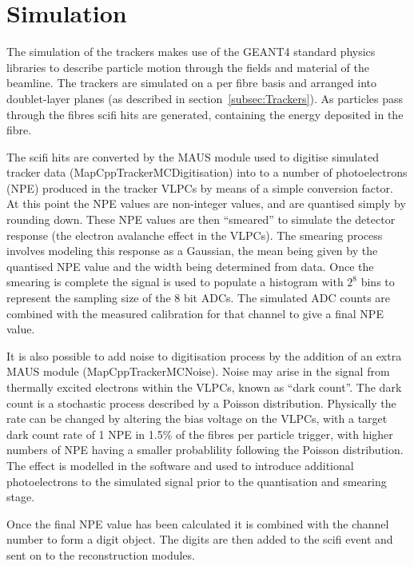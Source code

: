 \section{Simulation}
\label{sec:Simulation}

The simulation of the trackers makes use of the GEANT4 standard physics libraries to describe particle motion through the fields and material of the beamline. The trackers are simulated on a per fibre basis and arranged into doublet-layer planes (as described in section~\ref{subsec:Trackers}). As particles pass through the fibres scifi hits are generated, containing the energy deposited in the fibre. 

The scifi hits are converted by the MAUS module used to digitise simulated tracker data (MapCppTrackerMCDigitisation) into to a number of photoelectrons (NPE) produced in the tracker VLPCs by means of a simple conversion factor. At this point the NPE values are non-integer values, and are quantised simply by rounding down. These NPE values are then ``smeared'' to simulate the detector response (the electron avalanche effect in the VLPCs). The smearing process involves modeling this response as a Gaussian, the mean being given by the quantised NPE value and the width being determined from data. Once the smearing is complete the signal is used to populate a histogram with $2^8$ bins to represent the sampling size of the 8 bit ADCs. The simulated ADC counts are combined with the measured calibration for that channel to give a final NPE value.

It is also possible to add noise to digitisation process by the addition of an extra MAUS module (MapCppTrackerMCNoise). Noise may arise in the signal from thermally excited electrons within the VLPCs, known as ``dark count''. The dark count is a stochastic process described by a Poisson distribution. Physically the rate can be changed by altering the bias voltage on the VLPCs, with a target dark count rate of 1 NPE in 1.5\% of the fibres per particle trigger, with higher numbers of NPE having a smaller probablility following the Poisson distribution. The effect is modelled in the software and used to introduce additional photoelectrons to the simulated signal prior to the quantisation and smearing stage. 

Once the final NPE value has been calculated it is combined with the channel number to form a digit object. The digits are then added to the scifi event and sent on to the reconstruction modules.



